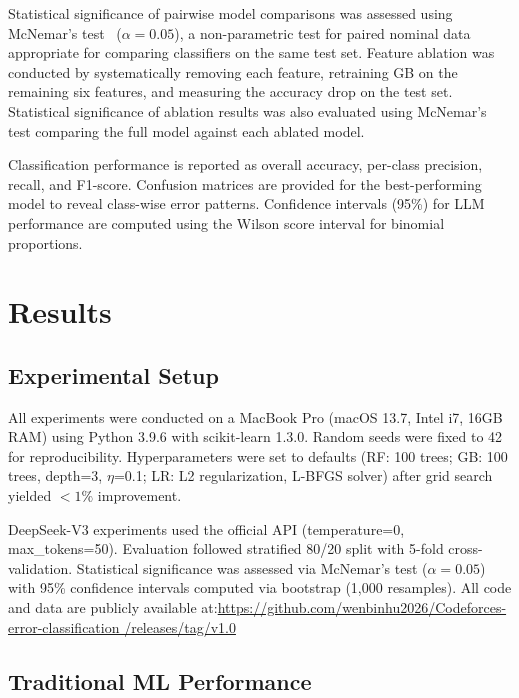 \documentclass[10pt,a4paper]{article}
\begin{document}
Statistical significance of pairwise model comparisons was assessed using
McNemar's test~\cite{mcnemar1947note} ($\alpha = 0.05$), a non-parametric test
for paired nominal data appropriate for comparing classifiers on the same test
set. Feature ablation was conducted by systematically removing each feature,
retraining GB on the remaining six features, and measuring the accuracy
drop on the test set. Statistical significance of ablation results was also
evaluated using McNemar's test comparing the full model against each ablated
model.

Classification performance is reported as overall accuracy, per-class
precision, recall, and F1-score. Confusion matrices are provided for the
best-performing model to reveal class-wise error patterns. Confidence
intervals (95\%) for LLM performance are computed using the Wilson score
interval for binomial proportions.

\section{Results}

\subsection{Experimental Setup}

All experiments were conducted on a MacBook Pro (macOS 13.7, Intel i7, 16GB
RAM) using Python 3.9.6 with scikit-learn 1.3.0. Random seeds were fixed to
42 for reproducibility. Hyperparameters were set to defaults (RF: 100 trees;
GB: 100 trees, depth=3, $\eta$=0.1; LR: L2 regularization, L-BFGS solver)
after grid search yielded $<1\%$ improvement.

DeepSeek-V3 experiments used the official API (temperature=0,
max\_tokens=50). Evaluation followed stratified 80/20 split with 5-fold
cross-validation. Statistical significance was assessed via McNemar's test
($\alpha=0.05$) with 95\% confidence intervals computed via bootstrap (1,000
resamples). All code and data are publicly available
at:\url{https://github.com/wenbinhu2026/Codeforces-error-classification
/releases/tag/v1.0}

\subsection{Traditional ML Performance}
\end{document}
